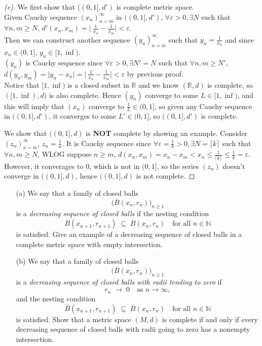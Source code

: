 \begin{proof}[(e)]
    We first show that $((0,1],d')$ is complete metric space. \\
    Given Cauchy sequence $(x_n)_{n=m}^\infty$ in $((0,1],d')$, $\forall \varepsilon > 0, \exists N$ such that $\forall n,m \geq N$, $d'(x_n,x_m) = \lvert \ \frac{1}{x_n} - \frac{1}{x_m} \rvert < \varepsilon$. \\
    Then we can construct another sequence $(y_n)_{n=m}^\infty$ such that $y_n = \frac{1}{x_n}$ and since $x_n \in (0, 1]$, $y_n \in [1,\inf)$. \\
    $(y_n)$ is Cauchy sequence since $\forall \varepsilon > 0, \exists N' = N$ such that $\forall n,m \geq N'$, $d(y_n, y_m) = \lvert y_n - x_n\rvert = \lvert \ \frac{1}{x_n} - \frac{1}{x_m} \rvert < \varepsilon$ by previous proof. \\
    Notice that $[1, \inf)$ is a closed subset in $\mathbb{R}$ and we know $(\mathbb{R}, d)$ is complete, so $([1, \inf),d)$ is also complete. Hence $(y_n)$ converge to some $L \in [1,\inf)$, and this will imply that $(x_n)$ converge to $\frac{1}{L} \in (0,1]$, so given any Cauchy sequence in $((0,1],d')$, it converges to some $L' \in (0,1]$, so $((0,1],d')$ is complete.

    We show that $((0,1],d)$ is \textbf{NOT} complete by showing an example.
    Consider $(z_n)_{n=m}^\infty$, $z_n = \frac{1}{n}$. It is Cauchy sequence since $\forall \varepsilon = \frac{1}{k}> 0, \exists N = \lceil k \rceil$ such that $\forall n, m \geq N$, WLOG suppose $n \geq m$, $d(x_n, x_m) = x_n - x_m < x_n \leq \frac{1}{\lceil k \rceil} \leq  \frac{1}{k} = \varepsilon$. \\
    However, it converages to $0$, which is not in $(0,1]$, so the series $(z_n)$ doesn't converge in $((0,1],d)$, hence $((0,1],d)$ is not complete.
    
\end{proof}

\begin{problem}
    \begin{enumerate}

  \item[(a)] 
  We say that a family of closed balls 
\[
\bigl(\overline{B}(x_n,r_n)\bigr)_{n\ge 1}
\]
is a \emph{decreasing sequence of closed balls} if 
the nesting condition
\[
\overline{B}(x_{n+1},r_{n+1}) \;\subseteq\; \overline{B}(x_n,r_n)
\quad\text{for all } n\in\mathbb{N}
\]
is satisfied. Give an example of a decreasing sequence of closed balls in a complete metric space with empty intersection. 

  \item[(b)]  We say that a family of closed balls 
\[
\bigl(\overline{B}(x_n,r_n)\bigr)_{n\ge 1}
\]
is a \emph{decreasing sequence of closed balls with radii tending to zero} if 
\[
r_n \;\to\; 0 \quad\text{as } n\to\infty,
\]
and the nesting condition
\[
\overline{B}(x_{n+1},r_{n+1}) \;\subseteq\; \overline{B}(x_n,r_n)
\quad\text{for all } n\in\mathbb{N}
\]
is satisfied.
  Show that a metric space $(M,d)$ is complete if and only if every decreasing sequence of closed balls with radii going to zero has a nonempty intersection. \end{enumerate}
\end{problem}

